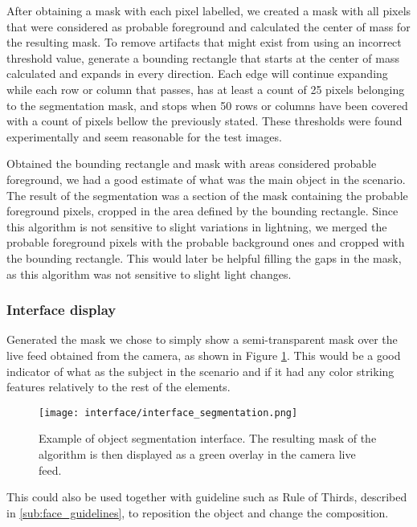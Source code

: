 After obtaining a mask with each pixel labelled, we created a mask with all pixels that were considered as probable foreground and calculated the center of mass for the resulting mask. To remove artifacts that might exist from using an incorrect threshold value, generate a bounding rectangle that starts at the center of mass calculated and expands in every direction. Each edge will continue expanding while each row or column that passes, has at least a count of 25 pixels belonging to the segmentation mask, and stops when 50 rows or columns have been covered with a count of pixels bellow the previously stated. These thresholds were found experimentally and seem reasonable for the test images.

Obtained the bounding rectangle and mask with areas considered probable foreground, we had a good estimate of what was the main object in the scenario. The result of the segmentation was a section of the mask containing the probable foreground pixels, cropped in the area defined by the bounding rectangle. Since this algorithm is not sensitive to slight variations in lightning, we merged the probable foreground pixels with the probable background ones and cropped with the bounding rectangle. This would later be helpful filling the gaps in the mask, as this algorithm was not sensitive to slight light changes.

\subsubsection{Interface display}

Generated the mask we chose to simply show a semi-transparent mask over the live feed obtained from the camera, as shown in Figure \ref{fig:interface_segmentation}. This would be a good indicator of what as the subject in the scenario and if it had any color striking features relatively to the rest of the elements.

\begin{figure}[htbp]
	\centering
	\texttt{[image: interface/interface\_segmentation.png]}
    \caption{Example of object segmentation interface. The resulting mask of the algorithm is then displayed as a green overlay in the camera live feed.}
  	\label{fig:interface_segmentation}
\end{figure}

This could also be used together with guideline such as Rule of Thirds, described in \ref{sub:face_guidelines}, to reposition the object and change the composition.

